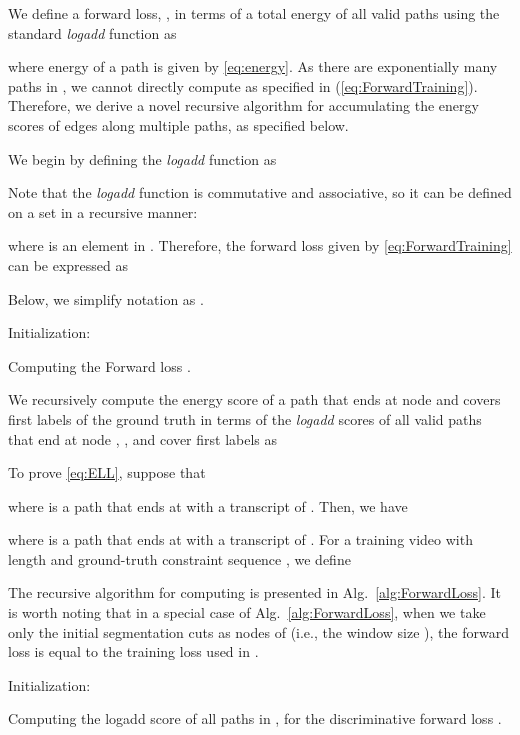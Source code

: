 \documentclass[10pt,twocolumn,letterpaper]{article}
\begin{document}
We define a forward loss,  , in terms of a total energy of all valid paths using the standard {\em logadd} function as

where energy of a path  is given by \eqref{eq:energy}. As there are exponentially many paths in , we cannot directly compute  as specified in (\ref{eq:ForwardTraining}).  Therefore, we derive a novel recursive algorithm for accumulating the energy scores of edges along multiple paths, as specified below.

We begin by defining the {\em logadd} function as

Note that the {\em logadd} function is commutative and associative, so  it can be defined on  a set  in a recursive manner:

where  is an element in .
Therefore, the forward loss given by \eqref{eq:ForwardTraining} can be expressed as

Below, we simplify notation as .


\begin{algorithm}[t]
\SetAlgoLined
\KwIn{}
Initialization:  \;
\caption{Computing the Forward loss  . }
\label{alg:ForwardLoss}
\end{algorithm}


We recursively compute the energy score  of a path that ends at node  and covers first  labels of the ground truth    in terms of the {\em logadd} scores  of all valid paths that end at node , , and cover first  labels as

To prove \eqref{eq:ELL}, suppose that

where  is a path that ends at  with a transcript of . Then, we have

where  is a path that ends at  with a transcript of .
For a training video with length  and ground-truth constraint sequence , we define

The recursive algorithm for computing  is presented in Alg.~\ref{alg:ForwardLoss}. It is worth noting that in a special case of Alg.~\ref{alg:ForwardLoss}, when we take only the initial segmentation cuts  as nodes of  (i.e., the window size ), the forward loss is equal to the training loss used in \cite{richard2018neuralnetwork}.



\begin{algorithm}[t]
\SetAlgoLined
\KwIn{}
\KwOut{}
Initialization:  \;
\caption{Computing the logadd score of all paths in , for  the discriminative forward loss . }
\label{alg:DF}
\end{algorithm}
\end{document}
